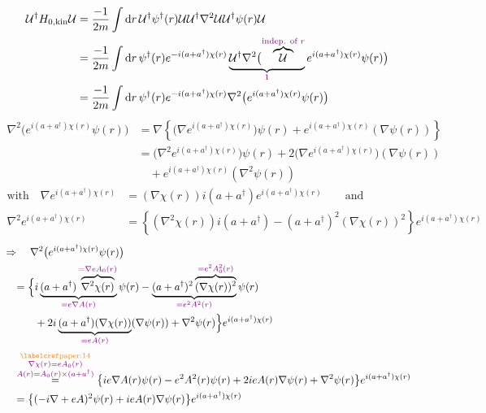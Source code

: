 \begin{align*}
\mathcal U^\dagger H_{0,\mathrm{kin}}\mathcal U
 &=\frac{-1}{2m}\int \mathop{}\!\mathrm{d} r\,
    \mathcal U^\dagger\psi^\dagger(r)\mathcal U\mathcal U^\dagger
     \nabla^2\mathcal U\mathcal U^\dagger\psi(r)\mathcal U\\
 &=\frac{-1}{2m}\int \mathop{}\!\mathrm{d} r\,\psi^\dagger(r)e^{-i(a+a^\dagger)\chi(r)}
    \underbrace{\mathcal U^\dagger\nabla^2\bigl(
      \overbrace{\mathcal U}^{\textcolor{violet}{\text{indep. of \(r\)}}}}
      _{\textcolor{violet}{1}}
      e^{i(a+a^\dagger)\chi(r)}\psi(r)\bigr)\\
 &=\frac{-1}{2m}\int \mathop{}\!\mathrm{d} r\,\psi^\dagger(r)e^{-i(a+a^\dagger)\chi(r)}
      \nabla^2\bigl(e^{i(a+a^\dagger)\chi(r)}\psi(r)\bigr)
\end{align*}
\begin{align*}
\nabla^2\bigl(e^{i(a+a^\dagger)\chi(r)}\psi(r)\bigr)
 &=\nabla\left\{\bigl(\nabla e^{i(a+a^\dagger)\chi(r)}\bigr)\psi(r)
   +e^{i(a+a^\dagger)\chi(r)}(\nabla\psi(r))\right\}\\
 &=\bigl(\nabla^2 e^{i(a+a^\dagger)\chi(r)}\bigr)\psi(r)
    +2\bigl(\nabla e^{i(a+a^\dagger)\chi(r)}\bigr)(\nabla\psi(r))\\
 &\quad +e^{i(a+a^\dagger)\chi(r)}(\nabla^2\psi(r))
\end{align*}
\begin{align*}
\text{with}\quad \nabla e^{i(a+a^\dagger)\chi(r)}
  &=(\nabla\chi(r))i(a+a^\dagger)e^{i(a+a^\dagger)\chi(r)}
    \qquad \text{and}\\
\nabla^2e^{i(a+a^\dagger)\chi(r)}
  &=\left\{(\nabla^2\chi(r))i(a+a^\dagger)
     -(a+a^\dagger)^2(\nabla\chi(r))^2\right\}
       e^{i(a+a^\dagger)\chi(r)}
\end{align*}
\begin{align*}
&\Rightarrow\quad\nabla^2\bigl(e^{i(a+a^\dagger)\chi(r)}\psi(r)\bigr)\\
&\quad=
 \Bigl\{
   i\underbrace{(a+a^\dagger)
      \overbrace{\nabla^2\chi(r)}^{\annotation{=\nabla e A_0(r)}}}
      _{\annotation{=e\nabla A(r)}}\psi(r)
   -\underbrace{(a+a^\dagger)^2
      \overbrace{(\nabla\chi(r))^2}^{\annotation{=e^2 A_0^2(r)}}}
      _{\annotation{=e^2 A^2(r)}}\psi(r)\\
&\qquad\quad +2i\underbrace{(a+a^\dagger)(\nabla\chi(r))}
       _{\annotation{=eA(r)}}(\nabla\psi(r))
   +\nabla^2\psi(r)
 \Bigr\}e^{i(a+a^\dagger)\chi(r)}\\[2pt]
&\quad\overset{\substack{\text{\scriptsize\paperref{paper:14}}\\
       \annotation{\nabla\chi(r)=eA_0(r)}\\
       \annotation{A(r)=A_0(r)\times(a+a^\dagger)}}}{=}
    \bigl\{ie\nabla A(r)\psi(r)-e^2A^2(r)\psi(r)
      +2ieA(r)\nabla\psi(r)+\nabla^2\psi(r)\bigr\}
      e^{i(a+a^\dagger)\chi(r)}\\
&\quad=\bigl\{(-i\nabla+eA)^2\psi(r)+ieA(r)\nabla\psi(r)\bigr\}
      e^{i(a+a^\dagger)\chi(r)}
\end{align*}
